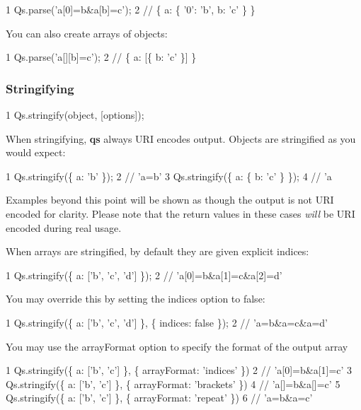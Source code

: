 \begin{DoxyCode}
1 Qs.parse('a[0]=b&a[b]=c');
2 // \{ a: \{ '0': 'b', b: 'c' \} \}
\end{DoxyCode}


You can also create arrays of objects\+:


\begin{DoxyCode}
1 Qs.parse('a[][b]=c');
2 // \{ a: [\{ b: 'c' \}] \}
\end{DoxyCode}


\subsubsection*{Stringifying}


\begin{DoxyCode}
1 Qs.stringify(object, [options]);
\end{DoxyCode}


When stringifying, {\bfseries qs} always U\+R\+I encodes output. Objects are stringified as you would expect\+:


\begin{DoxyCode}
1 Qs.stringify(\{ a: 'b' \});
2 // 'a=b'
3 Qs.stringify(\{ a: \{ b: 'c' \} \});
4 // 'a%
\end{DoxyCode}


Examples beyond this point will be shown as though the output is not U\+R\+I encoded for clarity. Please note that the return values in these cases {\itshape will} be U\+R\+I encoded during real usage.

When arrays are stringified, by default they are given explicit indices\+:


\begin{DoxyCode}
1 Qs.stringify(\{ a: ['b', 'c', 'd'] \});
2 // 'a[0]=b&a[1]=c&a[2]=d'
\end{DoxyCode}


You may override this by setting the {\ttfamily indices} option to {\ttfamily false}\+:


\begin{DoxyCode}
1 Qs.stringify(\{ a: ['b', 'c', 'd'] \}, \{ indices: false \});
2 // 'a=b&a=c&a=d'
\end{DoxyCode}


You may use the {\ttfamily array\+Format} option to specify the format of the output array


\begin{DoxyCode}
1 Qs.stringify(\{ a: ['b', 'c'] \}, \{ arrayFormat: 'indices' \})
2 // 'a[0]=b&a[1]=c'
3 Qs.stringify(\{ a: ['b', 'c'] \}, \{ arrayFormat: 'brackets' \})
4 // 'a[]=b&a[]=c'
5 Qs.stringify(\{ a: ['b', 'c'] \}, \{ arrayFormat: 'repeat' \})
6 // 'a=b&a=c'
\end{DoxyCode}


